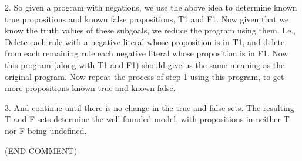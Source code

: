 2. So given a program with negations, we use the above idea to
determine known true propositions and known false propositions, T1 and
F1.  Now given that we know the truth values of these subgoals, we
reduce the program using them.  I.e., Delete each rule with a negative
literal whose proposition is in T1, and delete from each remaining
rule each negative literal whose proposition is in F1.  Now this
program (along with T1 and F1) should give us the same meaning as the
original program.  Now repeat the process of step 1 using this
program, to get more propositions known true and known false.

3. And continue until there is no change in the true and false sets.
The resulting T and F sets determine the well-founded model, with
propositions in neither T nor F being undefined.

(END COMMENT)

